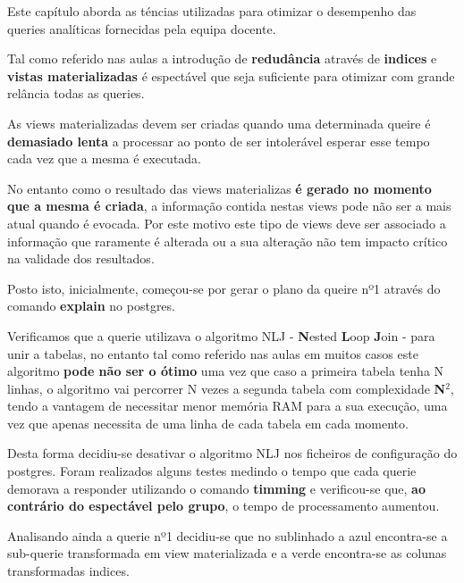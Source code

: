 \hspace{5mm} Este capítulo aborda as téncias utilizadas para otimizar o desempenho das queries analíticas fornecidas pela equipa docente.

\hspace{5mm} Tal como referido nas aulas a introdução de \textbf{redudância} através de \textbf{indices} e \textbf{vistas materializadas} é espectável que seja suficiente para otimizar com grande relância todas as queries.

\hspace{5mm} As views materializadas devem ser criadas quando uma determinada queire é \textbf{demasiado lenta} a processar ao ponto de ser intolerável esperar esse tempo cada vez que a mesma é executada. 

\hspace{5mm} No entanto como o resultado das views materializas \textbf{é gerado no momento que a mesma é criada}, a informação contida nestas views pode não ser a mais atual quando é evocada. Por este motivo este tipo de views deve ser associado a informação que raramente é alterada ou a sua alteração não tem impacto crítico na validade dos resultados.

\hspace{5mm} Posto isto, inicialmente, começou-se por gerar o plano da queire nº1 através do comando \textbf{explain} no postgres. 

\hspace{5mm} Verificamos que a querie utilizava o algoritmo NLJ - \textbf{N}ested \textbf{L}oop \textbf{J}oin - para unir a tabelas, no entanto tal como referido nas aulas em muitos casos este algoritmo \textbf{pode não ser o ótimo} uma vez que caso a primeira tabela tenha N linhas, o algoritmo vai percorrer N vezes a segunda tabela com complexidade \textbf{N$^2$}, tendo a vantagem de necessitar menor memória RAM para a sua execução, uma vez que apenas necessita de uma linha de cada tabela em cada momento.

\hspace{5mm} Desta forma decidiu-se desativar o algoritmo NLJ nos ficheiros de configuração do postgres. Foram realizados alguns testes medindo o tempo que cada querie demorava a responder utilizando o comando \textbf{timming} e verificou-se que, \textbf{ao contrário do espectável pelo grupo}, o tempo de processamento aumentou.  

\hspace{5mm} Analisando ainda a querie nº1 decidiu-se que no sublinhado a azul encontra-se a sub-querie transformada em view materializada e a verde encontra-se as colunas transformadas indices.

